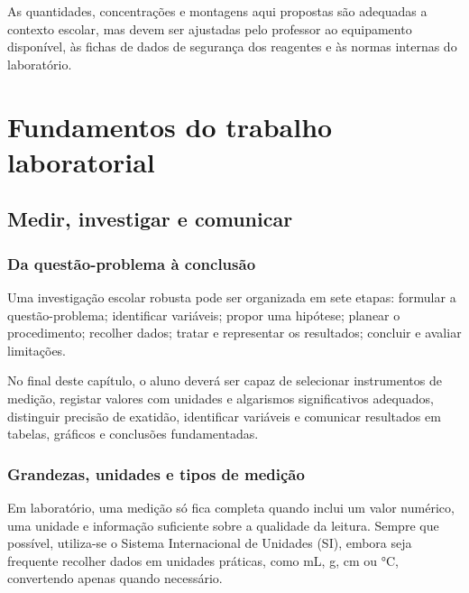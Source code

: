 \documentclass[11pt,a4paper,openany]{book}
\begin{document}
\begin{nota}
As quantidades, concentrações e montagens aqui propostas são adequadas a contexto escolar, mas devem ser ajustadas pelo professor ao equipamento disponível, às fichas de dados de segurança dos reagentes e às normas internas do laboratório.
\end{nota}

\tableofcontents

\mainmatter

\part{Fundamentos do trabalho laboratorial}

\chapter{Medir, investigar e comunicar}

\section{Da questão-problema à conclusão}
Uma investigação escolar robusta pode ser organizada em sete etapas: formular a questão-problema; identificar variáveis; propor uma hipótese; planear o procedimento; recolher dados; tratar e representar os resultados; concluir e avaliar limitações.

\begin{objetivos}
No final deste capítulo, o aluno deverá ser capaz de selecionar instrumentos de medição, registar valores com unidades e algarismos significativos adequados, distinguir precisão de exatidão, identificar variáveis e comunicar resultados em tabelas, gráficos e conclusões fundamentadas.
\end{objetivos}

\section{Grandezas, unidades e tipos de medição}
Em laboratório, uma medição só fica completa quando inclui um valor numérico, uma unidade e informação suficiente sobre a qualidade da leitura. Sempre que possível, utiliza-se o Sistema Internacional de Unidades (SI), embora seja frequente recolher dados em unidades práticas, como mL, g, cm ou \si{\celsius}, convertendo apenas quando necessário.
\end{document}
